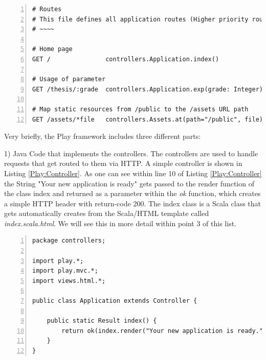 \begin{lstlisting}[numbers=left,caption={Simple routing configuration file within the Play Framework},label=Play:Routing,frame=tlbr,breaklines]
# Routes
# This file defines all application routes (Higher priority routes first)
# ~~~~

# Home page
GET /               controllers.Application.index()

# Usage of parameter
GET /thesis/:grade  controllers.Application.exp(grade: Integer)

# Map static resources from /public to the /assets URL path
GET /assets/*file   controllers.Assets.at(path="/public", file)
\end{lstlisting}

Very briefly, the Play framework includes three different parts: 

1) Java Code that implements the controllers. The controllers are used to handle requests that get routed to them via \ac{HTTP}. A simple controller is shown in Listing \ref{Play:Controller}. As one can see within line 10 of Listing \ref{Play:Controller} the String "Your new application is ready" gets passed to the render function of the class index and returned as a parameter within the \textit{ok} function, which creates a simple \ac{HTTP} header with return-code 200. The index class is a Scala class that gets automatically creates from the Scala/\ac{HTML} template called \textit{index.scala.html}. We will see this in more detail within point 3 of this list.

\begin{lstlisting}[numbers=left,caption={Simple Java-controller within the Play Framework},label=Play:Controller,frame=tlbr,breaklines]
package controllers;

import play.*;
import play.mvc.*;
import views.html.*;

public class Application extends Controller {

    public static Result index() {
        return ok(index.render("Your new application is ready."));
    }
}
\end{lstlisting}

